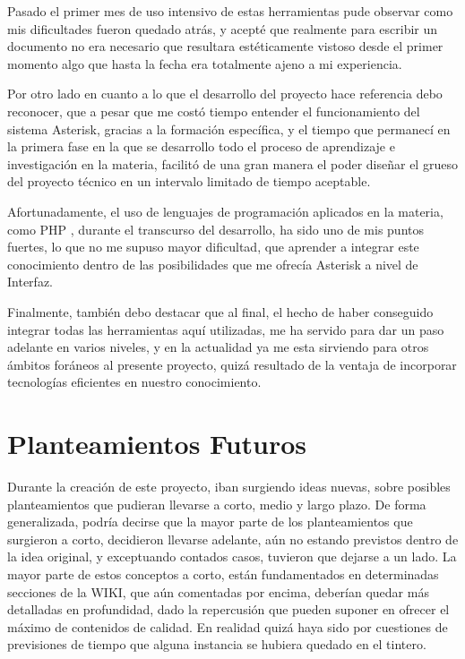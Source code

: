 Pasado el primer mes de uso intensivo de estas herramientas pude observar como mis dificultades fueron quedado atrás, y acepté que realmente para escribir un documento no era necesario que resultara estéticamente vistoso desde el primer momento algo que hasta la fecha era totalmente ajeno a mi experiencia.

Por otro lado en cuanto a lo que el desarrollo del proyecto hace referencia debo reconocer, que a pesar que me costó tiempo entender el funcionamiento del sistema Asterisk, gracias a la formación específica, y el tiempo que permanecí en la primera fase en la que se desarrollo todo el proceso de aprendizaje e investigación en la materia, facilitó de una gran manera el poder diseñar el grueso del proyecto técnico en un intervalo limitado de tiempo aceptable.

Afortunadamente, el uso de lenguajes de programación aplicados en la materia, como PHP \cite{website:php} \cite{gilmore10}, durante el transcurso del desarrollo, ha sido uno de mis puntos fuertes, lo que no me supuso mayor dificultad, que aprender a integrar este conocimiento dentro de las posibilidades que me ofrecía Asterisk a nivel de Interfaz.

Finalmente, también debo destacar que al final, el hecho de haber conseguido integrar todas las herramientas aquí utilizadas, me ha servido para dar un paso adelante en varios niveles, y en la actualidad ya me esta sirviendo para otros ámbitos foráneos al presente proyecto, quizá resultado de la ventaja de incorporar tecnologías eficientes en nuestro conocimiento.

\section{Planteamientos Futuros}

Durante la creación de este proyecto, iban surgiendo ideas nuevas, sobre posibles planteamientos que pudieran llevarse a corto, medio y largo plazo. De forma generalizada, podría decirse que la mayor parte de los planteamientos que surgieron a corto, decidieron llevarse adelante, aún no estando previstos dentro de la idea original, y exceptuando contados casos, tuvieron que dejarse a un lado. La mayor parte de estos conceptos a corto, están fundamentados en determinadas secciones de la WIKI, que aún comentadas por encima, deberían quedar más detalladas en profundidad, dado la repercusión que pueden suponer en ofrecer el máximo de contenidos de calidad. En realidad quizá haya sido por cuestiones de previsiones de tiempo que alguna instancia se hubiera quedado en el tintero.

